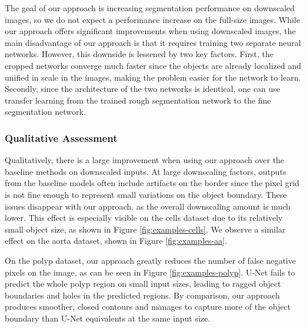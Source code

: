 The goal of our approach is increasing segmentation performance on downscaled images, so we do not expect a performance increase on the full-size images. While our approach offers significant improvements when using downscaled images, the main disadvantage of our approach is that it requires training two separate neural networks. However, this downside is lessened by two key factors. First, the cropped networks converge much faster since the objects are already localized and unified in scale in the images, making the problem easier for the network to learn. Secondly, since the architecture of the two networks is identical, one can use transfer learning from the trained rough segmentation network to the fine segmentation network.

\FloatBarrier

\subsubsection{Qualitative Assessment}

Qualitatively, there is a large improvement when using our approach over the baseline methods on downscaled inputs. At large downscaling factors, outputs from the baseline models often include artifacts on the border since the pixel grid is not fine enough to represent small variations on the object boundary. These issues disappear with our approach, as the overall downscaling amount is much lower. This effect is especially visible on the cells dataset due to its relatively small object size, as shown in Figure \ref{fig:examples-cells}. We observe a similar effect on the aorta dataset, shown in Figure \ref{fig:examples-aa}.

On the polyp dataset, our approach greatly reduces the number of false negative pixels on the image, as can be seen in Figure \ref{fig:examples-polyp}. U-Net fails to predict the whole polyp region on small input sizes, leading to ragged object boundaries and holes in the predicted regions. By comparison, our approach produces smoother, closed contours and manages to capture more of the object boundary than U-Net equivalents at the same input size.

